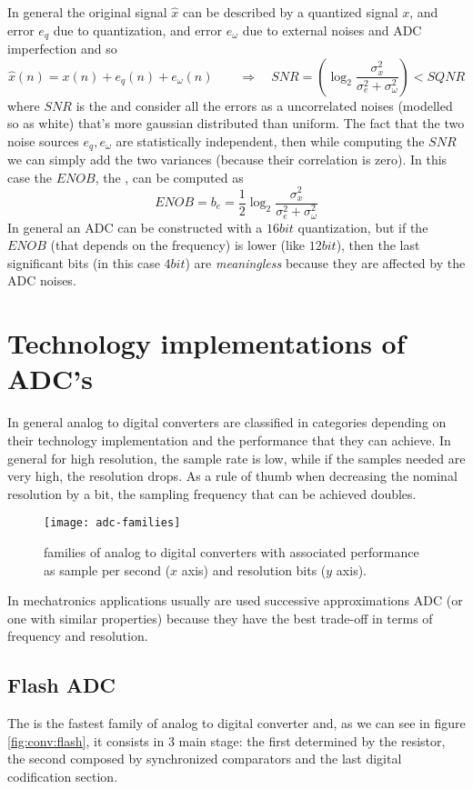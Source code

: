 	In general the original signal $\hat x$ can be described by a quantized signal $x$, and error $e_q$ due to quantization, and error $e_\omega$ due to external noises and ADC imperfection and so
	\[ \hat x(n) = x(n) + e_q(n) + e_\omega(n) \qquad \Rightarrow \quad SNR = \left(\log_2 \frac{\sigma_x^2}{\sigma_e^2+\sigma_\omega^2}\right) < SQNR \]
	where $SNR$ is the  and consider all the errors as a uncorrelated noises (modelled so as white) that's more gaussian distributed than uniform. The fact that the two noise sources $e_q,e_\omega$ are statistically independent, then while computing the $SNR$ we can simply add the two variances (because their correlation is zero). In this case the $ENOB$, the , can be computed as
	\begin{equation}
		ENOB = b_e = \frac 12 \log_2 \frac{\sigma_x^2}{\sigma_e^2+\sigma_\omega^2}
	\end{equation}
	In general an ADC can be constructed with a $16bit$ quantization, but if the $ENOB$ (that depends on the frequency) is lower (like $12bit$), then the last significant bits (in this case $4bit$) are \textit{meaningless} because they are affected by the ADC noises.
		
\section{Technology implementations of ADC's}
	In general analog to digital converters are classified in categories depending on their technology implementation and the performance that they can achieve. In general for high resolution, the sample rate is low, while if the samples needed are very high, the resolution drops. As a rule of thumb when decreasing the nominal resolution by a bit, the sampling frequency that can be achieved doubles.
	
	\begin{SCfigure}[1][bht]
		\centering
		\texttt{[image: adc-families]}
		\caption{families of analog to digital converters with associated performance as sample per second ($x$ axis) and resolution bits ($y$ axis).}
	\end{SCfigure}

	In mechatronics applications usually are used successive approximations ADC (or one with similar properties) because they have the best trade-off in terms of frequency and resolution.
	
	\subsection*{Flash ADC}
		The  is the fastest family of analog to digital converter and, as we can see in figure \ref{fig:conv:flash}, it consists in 3 main stage: the first determined by the resistor, the second composed by synchronized comparators and the last digital codification section.
		
